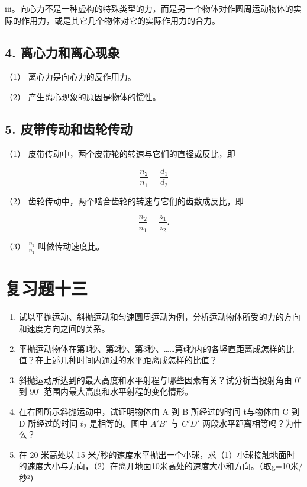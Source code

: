 iii。向心力不是一种虚构的特殊类型的力，而是另一个物体对作圆周运动物体的实际的作用力，或是其它几个物体对它的实际作用力的合力。

\subsection{4.
离心力和离心现象}\label{ux79bbux5fc3ux529bux548cux79bbux5fc3ux73b0ux8c61}

（1） 离心力是向心力的反作用力。

（2） 产生离心现象的原因是物体的惯性。

\subsection{5.
皮带传动和齿轮传动}\label{ux76aeux5e26ux4f20ux52a8ux548cux9f7fux8f6eux4f20ux52a8-1}

（1） 皮带传动中，两个皮带轮的转速与它们的直径或反比，即

\[
\frac {n _ {2}}{n _ {1}} = \frac {d _ {1}}{d _ {2}}
\]

（2） 齿轮传动中，两个啮合齿轮的转速与它们的齿数成反比，即

\[
\frac {n _ {2}}{n _ {1}} = \frac {z _ {1}}{z _ {2}}.
\]

（3） \(\frac{n_2}{n_1}\) 叫做传动速度比。

\section{复习题十三}\label{ux590dux4e60ux9898ux5341ux4e09}

\begin{enumerate}
\def\labelenumi{\arabic{enumi}.}
\item
  试以平抛运动、斜抛运动和匀速圆周运动为例，分析运动物体所受的力的方向和速度方向之间的关系。
\item
  平抛运动物体在第1秒、第2秒、第3秒、\ldots\ldots 第t秒内的各竖直距离成怎样的比值？在上述几种时间内通过的水平距离成怎样的比值？
\item
  斜抛运动所达到的最大高度和水平射程与哪些因素有关？试分析当投射角由
  \(0^{\circ}\) 到 \(90^{\circ}\) 范围内最大高度和水平射程的变化情形。
\item
  在右图所示斜抛运动中，试证明物体由 A 到 B 所经过的时间 t与物体由 C 到
  D 所经过的时间 \(t_{2}\) 是相等的。图中 \(A'B'\) 与 \(C'D'\)
  两段水平距离相等吗？为什么？
\item
  在 20 米高处以 15
  米/秒的速度水平抛出一个小球，求（1）小球接触地面时的速度大小与方向，（2）在离开地面10米高处的速度大小和方向。（取g=10米/秒²）
\end{enumerate}

